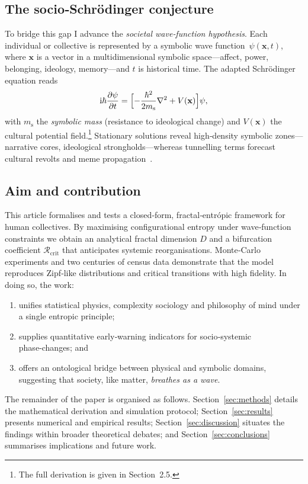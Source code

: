 \subsection{The socio‑Schrödinger conjecture}

To bridge this gap I advance the \emph{societal wave‑function hypothesis}.  Each individual or collective is represented by a symbolic wave function $\psi(\mathbf{x},t)$, where $\mathbf{x}$ is a vector in a multidimensional symbolic space—affect, power, belonging, ideology, memory—and $t$ is historical time.\citep{agourakis2025wave}  The adapted Schrödinger equation reads
\[
  \mathrm{i}\hbar\frac{\partial\psi}{\partial t}
  =\Bigl[-\frac{\hbar^{2}}{2m_{\mathrm{s}}}\nabla^{2}+V(\mathbf{x})\Bigr]\psi,
\]
with $m_{\mathrm{s}}$ the \emph{symbolic mass} (resistance to ideological change) and $V(\mathbf{x})$ the cultural potential field.\footnote{The full derivation is given in Section 2.5.}  Stationary solutions reveal high‑density symbolic zones—narrative cores, ideological strongholds—whereas tunnelling terms forecast cultural revolts and meme propagation .

\subsection{Aim and contribution}

This article formalises and tests a closed‑form, fractal‑entrópic framework for human collectives.  By maximising configurational entropy under wave‑function constraints we obtain an analytical fractal dimension $D$ and a bifurcation coefficient $\mathcal{R}_{\text{crit}}$ that anticipates systemic reorganisations.  Monte‑Carlo experiments and two centuries of census data demonstrate that the model reproduces Zipf‑like distributions and critical transitions with high fidelity.  In doing so, the work:

\begin{enumerate}
  \item unifies statistical physics, complexity sociology and philosophy of mind under a single entropic principle;
  \item supplies quantitative early‑warning indicators for socio‑systemic phase‑changes; and
  \item offers an ontological bridge between physical and symbolic domains, suggesting that society, like matter, \emph{breathes as a wave}.
\end{enumerate}

The remainder of the paper is organised as follows.  Section~\ref{sec:methods} details the mathematical derivation and simulation protocol; Section~\ref{sec:results} presents numerical and empirical results; Section~\ref{sec:discussion} situates the findings within broader theoretical debates; and Section~\ref{sec:conclusions} summarises implications and future work.

